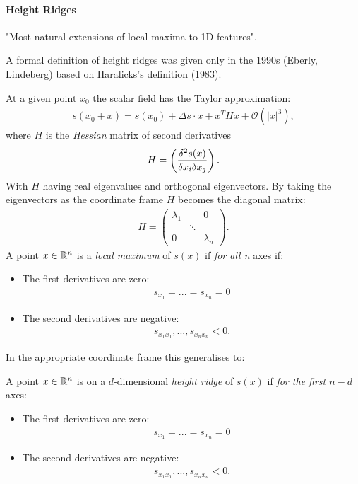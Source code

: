 \paragraph{Height Ridges}
"Most natural extensions of local maxima to 1D features". 

A formal definition of height ridges was given only in the 1990s (Eberly, Lindeberg) based on Haralicks's definition (1983).

At a given point $x_0$ the scalar field has the Taylor approximation:
\begin{align*}
    s(x_0+x) = s(x_0)+\Delta s\cdot x + x^THx + \mathcal O(|x|^3),
\end{align*}
where $H$ is the \emph{Hessian} matrix of second derivatives
\begin{align*}
 H = \left( {\delta^2 s(x)\over \delta x_i \delta x_j}\right).
\end{align*}
With $H$ having real eigenvalues and orthogonal eigenvectors. By taking the eigenvectors as the coordinate frame $H$ becomes the diagonal matrix:
\begin{align*}
    H = 
        \begin{pmatrix}
             \lambda_1 & & 0\\
             & \ddots\\
             0 & & \lambda_n
        \end{pmatrix}.
\end{align*}
 A point $x\in \mathbb{R}^n$ is a \emph{local maximum} of $s(x)$ if \emph{for all n} axes if:
\begin{itemize}
 \item The first derivatives are zero:
     \begin{align*}
         s_{x_1} = ... = s_{x_n} = 0
     \end{align*}
 \item The second derivatives are negative:
     \begin{align*}
         s_{x_1 x_1}, ..., s_{x_n x_n} < 0.
     \end{align*}
\end{itemize}

In the appropriate coordinate frame this generalises to:

A point $x\in \mathbb{R}^n$ is on a $d$-dimensional \emph{height ridge} of $s(x)$ if \emph{for the first $n-d$} axes:
\begin{itemize}
 \item The first derivatives are zero:
     \begin{align*}
         s_{x_1} = ... = s_{x_n} = 0
     \end{align*}
 \item The second derivatives are negative:
     \begin{align*}
         s_{x_1 x_1}, ..., s_{x_n x_n} < 0.
     \end{align*}
\end{itemize}

